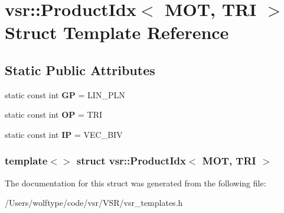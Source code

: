\hypertarget{structvsr_1_1_product_idx_3_01_m_o_t_00_01_t_r_i_01_4}{\section{vsr\-:\-:Product\-Idx$<$ M\-O\-T, T\-R\-I $>$ Struct Template Reference}
\label{structvsr_1_1_product_idx_3_01_m_o_t_00_01_t_r_i_01_4}
}
\subsection*{Static Public Attributes}
\begin{DoxyCompactItemize}
\item 
\hypertarget{structvsr_1_1_product_idx_3_01_m_o_t_00_01_t_r_i_01_4_a6f854437337a526821914ac3465887fa}{static const int {\bfseries G\-P} = L\-I\-N\-\_\-\-P\-L\-N}\label{structvsr_1_1_product_idx_3_01_m_o_t_00_01_t_r_i_01_4_a6f854437337a526821914ac3465887fa}

\item 
\hypertarget{structvsr_1_1_product_idx_3_01_m_o_t_00_01_t_r_i_01_4_acb75c937be7706cef7d909b0f1564af8}{static const int {\bfseries O\-P} = T\-R\-I}\label{structvsr_1_1_product_idx_3_01_m_o_t_00_01_t_r_i_01_4_acb75c937be7706cef7d909b0f1564af8}

\item 
\hypertarget{structvsr_1_1_product_idx_3_01_m_o_t_00_01_t_r_i_01_4_a887de8280ec605f6c75e6da28e1cdf66}{static const int {\bfseries I\-P} = V\-E\-C\-\_\-\-B\-I\-V}\label{structvsr_1_1_product_idx_3_01_m_o_t_00_01_t_r_i_01_4_a887de8280ec605f6c75e6da28e1cdf66}

\end{DoxyCompactItemize}
\subsubsection*{template$<$$>$ struct vsr\-::\-Product\-Idx$<$ M\-O\-T, T\-R\-I $>$}



The documentation for this struct was generated from the following file\-:\begin{DoxyCompactItemize}
\item 
/\-Users/wolftype/code/vsr/\-V\-S\-R/vsr\-\_\-templates.\-h\end{DoxyCompactItemize}
